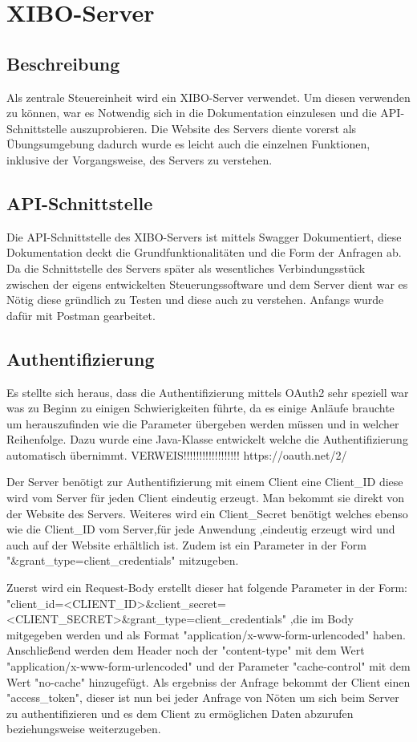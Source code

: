 \chapter{XIBO-Server}
\section{Beschreibung}
Als zentrale Steuereinheit wird ein XIBO-Server verwendet. Um diesen verwenden zu können, war es Notwendig sich in die Dokumentation einzulesen und die API-Schnittstelle auszuprobieren. Die Website des Servers diente vorerst als Übungsumgebung dadurch wurde es leicht auch die einzelnen Funktionen, inklusive der Vorgangsweise, des Servers zu verstehen.

\section{API-Schnittstelle}
Die API-Schnittstelle des XIBO-Servers ist mittels Swagger Dokumentiert, diese Dokumentation deckt die Grundfunktionalitäten und die Form der Anfragen ab. Da die Schnittstelle des Servers später als wesentliches Verbindungsstück zwischen der eigens entwickelten Steuerungssoftware und dem Server dient war es Nötig diese gründlich zu Testen und diese auch zu verstehen. Anfangs wurde dafür mit Postman gearbeitet. 


\section{Authentifizierung}
Es stellte sich heraus, dass die Authentifizierung mittels OAuth2 sehr speziell war was zu Beginn zu einigen Schwierigkeiten führte, da es einige Anläufe brauchte um herauszufinden wie die Parameter übergeben werden müssen und in welcher Reihenfolge. Dazu wurde eine Java-Klasse entwickelt welche die Authentifizierung automatisch übernimmt.
VERWEIS!!!!!!!!!!!!!!!!!!
https://oauth.net/2/

Der Server benötigt zur Authentifizierung mit einem Client eine Client_ID diese wird vom Server für jeden Client eindeutig erzeugt. Man bekommt sie direkt von der Website des Servers. 
Weiteres wird ein Client_Secret benötigt welches ebenso wie die Client_ID vom Server,für jede Anwendung ,eindeutig erzeugt wird und auch auf der Website erhältlich ist. Zudem ist ein Parameter in der Form "&grant_type=client_credentials" mitzugeben.

Zuerst wird ein Request-Body erstellt dieser hat folgende Parameter in der Form: 
 "client_id=<CLIENT_ID>&client_secret=<CLIENT_SECRET>&grant_type=client_credentials"
,die im Body mitgegeben werden und als Format "application/x-www-form-urlencoded"  haben. Anschließend werden dem Header noch der "content-type" mit dem Wert "application/x-www-form-urlencoded" und der Parameter "cache-control" mit dem Wert "no-cache" hinzugefügt. Als ergebniss der Anfrage bekommt der Client einen "access_token", dieser ist nun bei jeder Anfrage von Nöten um sich beim Server zu authentifizieren und es dem Client zu ermöglichen Daten abzurufen beziehungsweise weiterzugeben.

